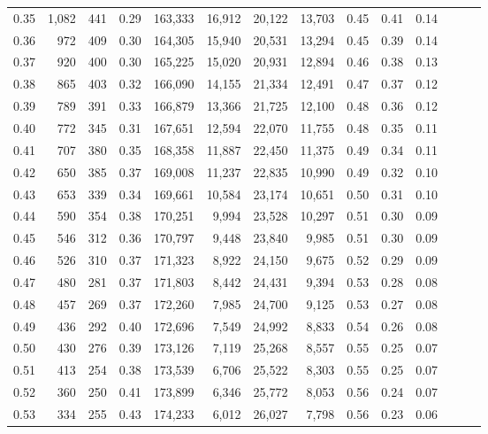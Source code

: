 \begin{tabular}{rrrrrrrrrrrrrr}
0.35 &   1,082 &  441 &  0.29 &  163,333 &   16,912 &  20,122 &  13,703 &  0.45 &  0.41 &      0.14 \\
0.36 &     972 &  409 &  0.30 &  164,305 &   15,940 &  20,531 &  13,294 &  0.45 &  0.39 &      0.14 \\
0.37 &     920 &  400 &  0.30 &  165,225 &   15,020 &  20,931 &  12,894 &  0.46 &  0.38 &      0.13 \\
0.38 &     865 &  403 &  0.32 &  166,090 &   14,155 &  21,334 &  12,491 &  0.47 &  0.37 &      0.12 \\
0.39 &     789 &  391 &  0.33 &  166,879 &   13,366 &  21,725 &  12,100 &  0.48 &  0.36 &      0.12 \\
0.40 &     772 &  345 &  0.31 &  167,651 &   12,594 &  22,070 &  11,755 &  0.48 &  0.35 &      0.11 \\
0.41 &     707 &  380 &  0.35 &  168,358 &   11,887 &  22,450 &  11,375 &  0.49 &  0.34 &      0.11 \\
0.42 &     650 &  385 &  0.37 &  169,008 &   11,237 &  22,835 &  10,990 &  0.49 &  0.32 &      0.10 \\
0.43 &     653 &  339 &  0.34 &  169,661 &   10,584 &  23,174 &  10,651 &  0.50 &  0.31 &      0.10 \\
0.44 &     590 &  354 &  0.38 &  170,251 &    9,994 &  23,528 &  10,297 &  0.51 &  0.30 &      0.09 \\
0.45 &     546 &  312 &  0.36 &  170,797 &    9,448 &  23,840 &   9,985 &  0.51 &  0.30 &      0.09 \\
0.46 &     526 &  310 &  0.37 &  171,323 &    8,922 &  24,150 &   9,675 &  0.52 &  0.29 &      0.09 \\
0.47 &     480 &  281 &  0.37 &  171,803 &    8,442 &  24,431 &   9,394 &  0.53 &  0.28 &      0.08 \\
0.48 &     457 &  269 &  0.37 &  172,260 &    7,985 &  24,700 &   9,125 &  0.53 &  0.27 &      0.08 \\
0.49 &     436 &  292 &  0.40 &  172,696 &    7,549 &  24,992 &   8,833 &  0.54 &  0.26 &      0.08 \\
0.50 &     430 &  276 &  0.39 &  173,126 &    7,119 &  25,268 &   8,557 &  0.55 &  0.25 &      0.07 \\
0.51 &     413 &  254 &  0.38 &  173,539 &    6,706 &  25,522 &   8,303 &  0.55 &  0.25 &      0.07 \\
0.52 &     360 &  250 &  0.41 &  173,899 &    6,346 &  25,772 &   8,053 &  0.56 &  0.24 &      0.07 \\
0.53 &     334 &  255 &  0.43 &  174,233 &    6,012 &  26,027 &   7,798 &  0.56 &  0.23 &      0.06 \\

\end{tabular}
